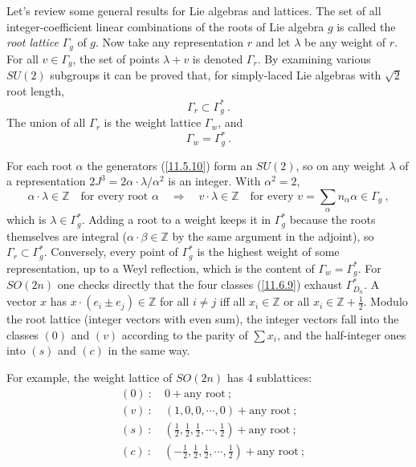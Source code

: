 Let's review some general results for Lie algebras and lattices. The set of all integer-coefficient linear combinations of the roots of Lie algebra $g$ is called the \emph{root lattice} $\Gamma_{g}$ of $g$. Now take any representation $r$ and let $\lambda$ be any weight of $r$. For all $v\in\Gamma_{g}$, the set of points $\lambda+v$ is denoted $\Gamma_{r}$. By examining various $SU(2)$ subgroups it can be proved that, for simply-laced Lie algebras with $\sqrt{2}$ root length,
\begin{equation}
	\Gamma_{r} \subset \Gamma_{g}^{\ast} \:. \label{11.6.7}
\end{equation}
The union of all $\Gamma_{r}$ is the weight lattice $\Gamma_{w}$, and
\begin{equation}
	\Gamma_{w}=\Gamma_{g}^{\ast} \:.
\end{equation}
\begin{tcolorbox}[breakable]
	\begin{remark}
		For each root $\alpha$ the generators (\ref{11.5.10}) form an $SU(2)$, so on any weight $\lambda$ of a representation $2J^{3}=2\alpha\cdot\lambda/\alpha^{2}$ is an integer. With $\alpha^{2}=2$,
		\begin{equation*}
			\alpha\cdot\lambda\in\mathds{Z}\quad\text{for every root }\alpha
			\quad\Longrightarrow\quad v\cdot\lambda\in\mathds{Z}\quad\text{for every }v=\textstyle\sum_{\alpha}n_{\alpha}\alpha\in\Gamma_{g}\:,
		\end{equation*}
		which is $\lambda\in\Gamma_{g}^{\ast}$. Adding a root to a weight keeps it in $\Gamma_{g}^{\ast}$ because the roots themselves are integral ($\alpha\cdot\beta\in\mathds{Z}$ by the same argument in the adjoint), so $\Gamma_{r}\subset\Gamma_{g}^{\ast}$. Conversely, every point of $\Gamma_{g}^{\ast}$ is the highest weight of some representation, up to a Weyl reflection, which is the content of $\Gamma_{w}=\Gamma_{g}^{\ast}$. For $SO(2n)$ one checks directly that the four classes (\ref{11.6.9}) exhaust $\Gamma^{\ast}_{D_{n}}$. A vector $x$ has $x\cdot(e_{i}\pm e_{j})\in\mathds{Z}$ for all $i\neq j$ iff all $x_{i}\in\mathds{Z}$ or all $x_{i}\in\mathds{Z}+\frac{1}{2}$. Modulo the root lattice (integer vectors with even sum), the integer vectors fall into the classes $(0)$ and $(v)$ according to the parity of $\sum x_{i}$, and the half-integer ones into $(s)$ and $(c)$ in the same way.
	\end{remark}
\end{tcolorbox}
For example, the weight lattice of $SO(2n)$ has 4 sublattices:
\begin{subequations}
	\begin{align}
		&(0)\::\quad 0+\text{any root}\:; \label{11.6.9a} \\
		&(v)\::\quad (1,0,0,\cdots,0)+\text{any root}\:; \label{11.6.9b} \\
		&(s)\::\quad (\tfrac{1}{2},\tfrac{1}{2},\tfrac{1}{2},\cdots,\tfrac{1}{2})+\text{any root}\:; \label{11.6.9c} \\
		&(c)\::\quad (-\tfrac{1}{2},\tfrac{1}{2},\tfrac{1}{2},\cdots,\tfrac{1}{2})+\text{any root}\:; \label{11.6.9d} 
	\end{align} \label{11.6.9}
\end{subequations}
